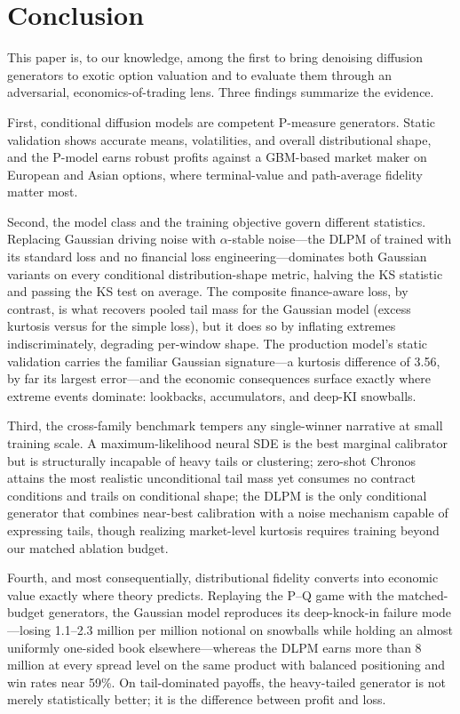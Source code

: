 \documentclass[12pt,letterpaper]{article}
\begin{document}
\section{Conclusion}\label{sec:conclusion}

This paper is, to our knowledge, among the first to bring denoising
diffusion generators to exotic option valuation and to evaluate them through
an adversarial, economics-of-trading lens. Three findings summarize the
evidence.

First, conditional diffusion models are competent P-measure generators.
Static validation shows accurate means, volatilities, and overall
distributional shape, and the P-model earns robust profits against a
GBM-based market maker on European and Asian options, where terminal-value
and path-average fidelity matter most.

Second, the model class and the training objective govern different
statistics. Replacing Gaussian driving noise with $\alpha$-stable
noise---the DLPM of \citet{shariatian2024dlpm} trained with its standard
loss and no financial loss engineering---dominates both Gaussian variants
on every conditional distribution-shape metric, halving the KS statistic
and passing the KS test on average. The composite finance-aware loss, by
contrast, is what recovers pooled tail mass for the Gaussian model (excess
kurtosis \poolKurtCpx{} versus \poolKurtSim{} for the simple loss), but it
does so by inflating extremes indiscriminately, degrading per-window shape.
The production model's static validation carries the familiar Gaussian
signature---a kurtosis difference of 3.56, by far its largest error---and
the economic consequences surface exactly where extreme events dominate:
lookbacks, accumulators, and deep-KI snowballs.

Third, the cross-family benchmark tempers any single-winner narrative at
small training scale. A maximum-likelihood neural SDE is the best marginal
calibrator but is structurally incapable of heavy tails or clustering;
zero-shot Chronos attains the most realistic unconditional tail mass yet
consumes no contract conditions and trails on conditional shape; the DLPM
is the only conditional generator that combines near-best calibration with
a noise mechanism capable of expressing tails, though realizing
market-level kurtosis requires training beyond our matched ablation budget.

Fourth, and most consequentially, distributional fidelity converts into
economic value exactly where theory predicts. Replaying the P--Q game with
the matched-budget generators, the Gaussian model reproduces its
deep-knock-in failure mode---losing 1.1--2.3 million per million notional
on snowballs while holding an almost uniformly one-sided book
elsewhere---whereas the DLPM earns more than 8 million at every spread
level on the same product with balanced positioning and win rates near
59\%. On tail-dominated payoffs, the heavy-tailed generator is not merely
statistically better; it is the difference between profit and loss.
\end{document}
